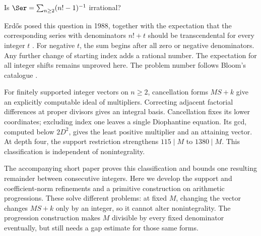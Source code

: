 \maketitle
\noteprovenance

\begin{abstract}
We classify multipliers in finitely supported factorial-weighted
cancellation forms $MS+k$, where $S=\sum_{n\ge2}(n!-1)^{-1}$, with
integer coefficients on $n\ge2$. An integral basis reduces cancellation through
$D\ge2$ and exclusion of index one to a Diophantine equation whose coefficient gcd
is determined below $2D^2$. Examples separate least multiplier, support
size and coefficient norm. We prove a lower bound for common-denominator growth,
analyse prime-power cancellation on reduction, and derive equivalent
carry and factorial-digit rationality criteria.
Recorded computations exclude $q\mid299999!$ and $q<2^{39990}$ under
$S=a/q$. These computations are outside Lean; the required nonintegrality
at arbitrarily large indices remains unproved.
\end{abstract}

\begin{problem}[Erd\H{o}s \#68]\label{long68:res:problem}
Is $\Ser=\sum_{n\ge2}(n!-1)^{-1}$ irrational?
\end{problem}

Erd\H{o}s posed this question in 1988, together with the expectation that
the corresponding series with denominators $n!+t$ should be
transcendental for every integer $t$ \cite[p.~102]{erdos1988}.
For negative $t$, the sum begins after all zero or negative denominators.
Any further change of starting index adds a rational number. The
expectation for all integer shifts remains unproved here.
The problem number follows Bloom's catalogue \cite{bloom}.

For finitely supported integer vectors on $n\ge2$, cancellation forms
$MS+k$ give an explicitly computable ideal of multipliers.
Correcting adjacent factorial differences at proper divisors gives an
integral basis. Cancellation fixes its lower coordinates; excluding
index one leaves a single Diophantine equation. Its gcd, computed below
$2D^2$, gives the least positive multiplier and an attaining vector.
At depth four, the support restriction strengthens $115\mid M$ to
$1380\mid M$. This classification is independent of nonintegrality.

The accompanying short paper proves this classification and bounds one
resulting remainder between consecutive integers. Here we develop the
support and coefficient-norm refinements and a primitive construction
on arithmetic progressions. These solve different problems: at fixed
$M$, changing the vector changes $MS+k$ only by an integer, so it cannot
alter nonintegrality. The progression construction makes $M$ divisible
by every fixed denominator eventually, but still needs a gap estimate
for those same forms.

